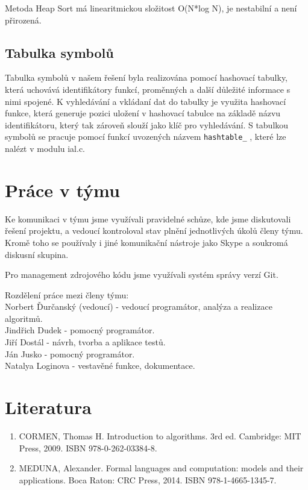 \documentclass[12pt,a4paper,titlepage,final]{report}
\begin{document}
Metoda Heap Sort má linearitmickou složitost O(N*log N), je nestabilní a není přirozená.

\section{Tabulka symbolů}
Tabulka symbolů v našem řešení byla realizována pomocí hashovací tabulky, která uchovává identifikátory funkcí, proměnných a další důležité informace s nimi spojené. K vyhledávání a vkládaní dat do tabulky je využita hashovací funkce, která generuje pozici uložení v hashovací tabulce na základě názvu identifikátoru, který tak zároveň slouží jako klíč pro vyhledávání. S tabulkou symbolů se pracuje pomocí funkcí uvozených názvem \texttt{hashtable\_} , které lze nalézt v modulu ial.c.

\chapter{Práce v týmu} \label{tym}
Ke komunikaci v týmu jsme využívali pravidelné schůze, kde jsme diskutovali řešení projektu, a vedoucí kontroloval stav plnění jednotlivých úkolů členy týmu. Kromě toho se používaly i jiné komunikační nástroje jako Skype a soukromá diskusní skupina.

Pro management zdrojového kódu jsme využívali systém správy verzí Git.

Rozdělení práce mezi členy týmu:\\
Norbert Ďurčanský (vedoucí) - vedoucí programátor, analýza a realizace algoritmů.\\
Jindřich Dudek - pomocný programátor.\\
Jiří Dostál - návrh, tvorba a aplikace testů.\\
Ján Jusko - pomocný programátor.\\
Natalya Loginova - vestavěné funkce, dokumentace. \\

\chapter{Literatura} \label{literatura}
\begin{enumerate}
  \item CORMEN, Thomas H. Introduction to algorithms. 3rd ed. Cambridge: MIT Press, 2009. ISBN 978-0-262-03384-8.
  \item MEDUNA, Alexander. Formal languages and computation: models and their applications. Boca Raton: CRC Press, 2014. ISBN 978-1-4665-1345-7.
\end{enumerate}
\newpage
\appendix
\clearpage%
\thispagestyle{empty}%
\end{document}
